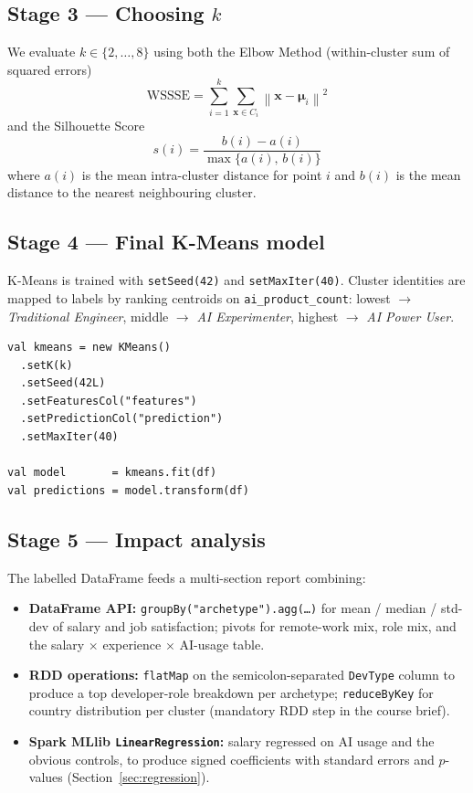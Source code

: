 \documentclass[11pt,a4paper]{article}
\begin{document}
\subsection{Stage 3 --- Choosing $k$}

We evaluate $k \in \{2, \ldots, 8\}$ using both the Elbow Method
(within-cluster sum of squared errors)
\begin{equation}
  \mathrm{WSSSE} = \sum_{i=1}^{k} \sum_{\mathbf{x} \in C_i}
  \left\| \mathbf{x} - \boldsymbol{\mu}_i \right\|^2
\end{equation}
and the Silhouette Score
\begin{equation}
  s(i) = \frac{b(i) - a(i)}{\max\{a(i),\, b(i)\}}
\end{equation}
where $a(i)$ is the mean intra-cluster distance for point $i$ and $b(i)$
is the mean distance to the nearest neighbouring cluster.

\subsection{Stage 4 --- Final K-Means model}

K-Means is trained with \texttt{setSeed(42)} and \texttt{setMaxIter(40)}.
Cluster identities are mapped to labels by ranking centroids on
\texttt{ai\_product\_count}: lowest $\to$ \textit{Traditional Engineer},
middle $\to$ \textit{AI Experimenter}, highest $\to$ \textit{AI Power User}.

\begin{lstlisting}[caption={Final K-Means model}]
val kmeans = new KMeans()
  .setK(k)
  .setSeed(42L)
  .setFeaturesCol("features")
  .setPredictionCol("prediction")
  .setMaxIter(40)

val model       = kmeans.fit(df)
val predictions = model.transform(df)
\end{lstlisting}

\subsection{Stage 5 --- Impact analysis}

The labelled DataFrame feeds a multi-section report combining:

\begin{itemize}[leftmargin=2em]
  \item \textbf{DataFrame API:} \texttt{groupBy("archetype").agg(\ldots)}
        for mean / median / std-dev of salary and job satisfaction; pivots
        for remote-work mix, role mix, and the salary $\times$ experience
        $\times$ AI-usage table.
  \item \textbf{RDD operations:} \texttt{flatMap} on the semicolon-separated
        \texttt{DevType} column to produce a top developer-role breakdown
        per archetype; \texttt{reduceByKey} for country distribution per
        cluster (mandatory RDD step in the course brief).
  \item \textbf{Spark MLlib \texttt{LinearRegression}:} salary regressed
        on AI usage and the obvious controls, to produce signed coefficients
        with standard errors and $p$-values
        (Section~\ref{sec:regression}).
\end{itemize}
\end{document}

